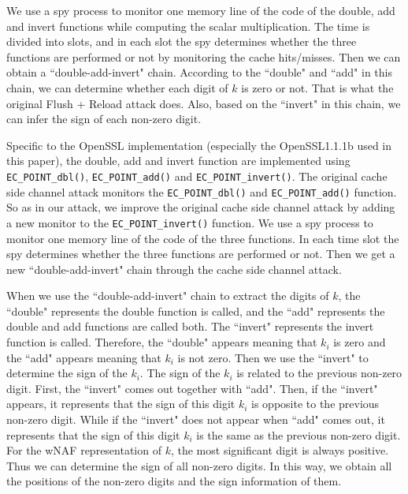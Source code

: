 We use a spy process to monitor one memory line of the code of the double, add and invert functions while computing the scalar multiplication.
The time is divided into slots, and in each slot
  the spy determines whether the three functions are performed or not by monitoring the cache hits/misses.
 Then we can obtain a ``double-add-invert" chain.
According to the ``double" and ``add" in this chain, we can determine whether each digit of $k$ is zero or not.
  That is what the original Flush + Reload attack does.
Also, based on the ``invert" in this chain, we can infer the sign of each non-zero digit.


Specific to the OpenSSL implementation (especially the OpenSSL1.1.1b used in this paper),
  the double, add and invert function are implemented using  \verb+EC_POINT_dbl()+, \verb+EC_POINT_add()+ and \verb+EC_POINT_invert()+.
 The original cache side channel attack monitors the \verb+EC_POINT_dbl()+ and \verb+EC_POINT_add()+ function.
So as in our attack, we improve the original cache side channel attack by adding a new monitor to the \verb+EC_POINT_invert()+ function.
We use a spy process to monitor one memory line of the code of the three functions.
 In each time slot
  the spy determines whether the three functions are performed or not.
Then we get a new ``double-add-invert" chain through the cache side channel attack.



When we use the ``double-add-invert" chain to extract the digits of $k$,
the ``double" represents the double function is called,
and the ``add" represents the double and add functions are called both.
The ``invert" represents the invert function is called.
Therefore,
 the ``double" appears meaning that $k_i$ is zero
and the ``add" appears meaning that $k_i$ is not zero.
 Then we use the ``invert" to determine the sign of the $k_i$.
The sign of the $k_i$ is related to the previous non-zero digit.
First, the ``invert" comes out together with ``add".
 Then, if the ``invert" appears, it represents that the sign of this digit $k_i$ is opposite to the previous non-zero digit.
 While if the ``invert" does not appear when ``add" comes out, it represents that
the sign of this digit $k_i$ is the same as the previous non-zero digit.
 For the wNAF representation of $k$, the most significant digit is always positive.
 Thus we can determine the sign of all non-zero digits.
In this way, we obtain all the positions of the non-zero digits and the sign information of them.


